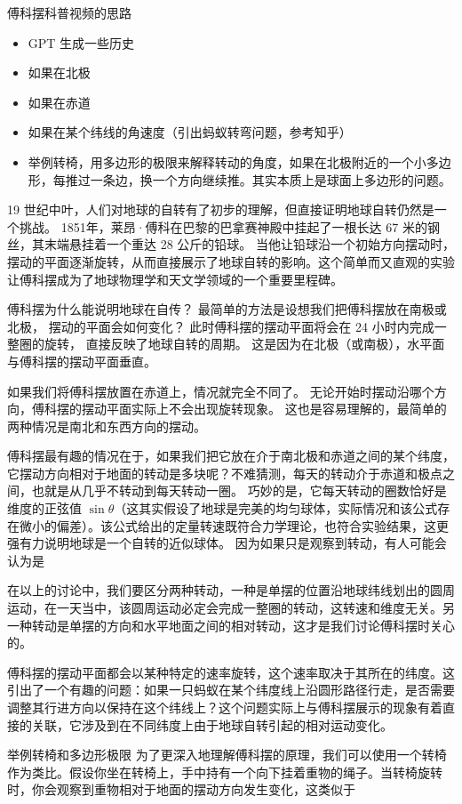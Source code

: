 
\begin{issues}
\issueDraft
\end{issues}

傅科摆科普视频的思路
\begin{itemize}
\item GPT 生成一些历史
\item 如果在北极
\item 如果在赤道
\item 如果在某个纬线的角速度（引出蚂蚁转弯问题，参考知乎）
\item 举例转椅，用多边形的极限来解释转动的角度，如果在北极附近的一个小多边形，每推过一条边，换一个方向继续推。其实本质上是球面上多边形的问题。
\end{itemize}

19 世纪中叶，人们对地球的自转有了初步的理解，但直接证明地球自转仍然是一个挑战。 1851年，莱昂·傅科在巴黎的巴拿赛神殿中挂起了一根长达 67 米的钢丝，其末端悬挂着一个重达 28 公斤的铅球。 当他让铅球沿一个初始方向摆动时，摆动的平面逐渐旋转，从而直接展示了地球自转的影响。这个简单而又直观的实验让傅科摆成为了地球物理学和天文学领域的一个重要里程碑。

傅科摆为什么能说明地球在自传？ 最简单的方法是设想我们把傅科摆放在南极或北极， 摆动的平面会如何变化？ 此时傅科摆的摆动平面将会在 24 小时内完成一整圈的旋转， 直接反映了地球自转的周期。 这是因为在北极（或南极），水平面与傅科摆的摆动平面垂直。

如果我们将傅科摆放置在赤道上，情况就完全不同了。 无论开始时摆动沿哪个方向，傅科摆的摆动平面实际上不会出现旋转现象。 这也是容易理解的，最简单的两种情况是南北和东西方向的摆动。

傅科摆最有趣的情况在于，如果我们把它放在介于南北极和赤道之间的某个纬度，它摆动方向相对于地面的转动是多块呢？不难猜测，每天的转动介于赤道和极点之间，也就是从几乎不转动到每天转动一圈。 巧妙的是，它每天转动的圈数恰好是维度的正弦值 $\sin\theta$（这其实假设了地球是完美的均匀球体，实际情况和该公式存在微小的偏差）。该公式给出的定量转速既符合力学理论，也符合实验结果，这更强有力说明地球是一个自转的近似球体。 因为如果只是观察到转动，有人可能会认为是

在以上的讨论中，我们要区分两种转动，一种是单摆的位置沿地球纬线划出的圆周运动，在一天当中，该圆周运动必定会完成一整圈的转动，这转速和维度无关。另一种转动是单摆的方向和水平地面之间的相对转动，这才是我们讨论傅科摆时关心的。

傅科摆的摆动平面都会以某种特定的速率旋转，这个速率取决于其所在的纬度。这引出了一个有趣的问题：如果一只蚂蚁在某个纬度线上沿圆形路径行走，是否需要调整其行进方向以保持在这个纬线上？这个问题实际上与傅科摆展示的现象有着直接的关联，它涉及到在不同纬度上由于地球自转引起的相对运动变化。

举例转椅和多边形极限
为了更深入地理解傅科摆的原理，我们可以使用一个转椅作为类比。假设你坐在转椅上，手中持有一个向下挂着重物的绳子。当转椅旋转时，你会观察到重物相对于地面的摆动方向发生变化，这类似于
